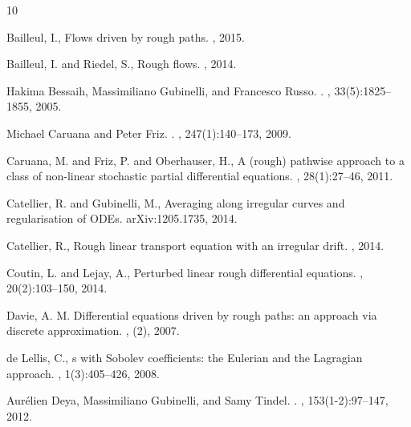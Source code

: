 \documentclass[11pt,a4paper]{amsart}
\numberwithin{equation}{section} %
\begin{document}
\bigskip

\begin{thebibliography}{10}

Bailleul, I.,
\newblock Flows driven by rough paths.
, 2015.


Bailleul, I. and Riedel, S.,
\newblock Rough flows.
, 2014.

Hakima Bessaih, Massimiliano Gubinelli, and Francesco Russo.
.
, 33(5):1825--1855, 2005.



Michael Caruana and Peter Friz.
.
, 247(1):140--173, 2009.

Caruana, M. and Friz, P. and Oberhauser, H.,
\newblock A (rough) pathwise approach to a class of non-linear stochastic partial differential equations.
, 28(1):27--46, 2011.

Catellier, R. and Gubinelli, M.,
\newblock Averaging along irregular curves and regularisation of ODEs.
\newblock arXiv:1205.1735, 2014.

Catellier, R.,
\newblock Rough linear transport equation with an irregular drift.
, 2014.

Coutin, L. and Lejay, A.,
\newblock Perturbed linear rough differential equations.
, 20(2):103--150, 2014.


Davie, A. M.
\newblock Differential equations driven by rough paths: an approach via discrete approximation.
, (2), 2007.

de Lellis, C.,
s with {S}obolev coefficients: the {E}ulerian and the {L}agragian approach.
, 1(3):405--426, 2008.

Aur{\'e}lien Deya, Massimiliano Gubinelli, and Samy Tindel.
.
, 153(1-2):97--147, 2012.


\end{thebibliography}
\end{document}
